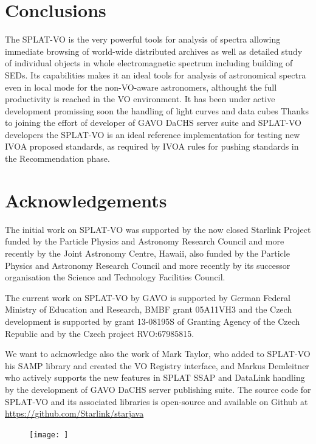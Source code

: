 \documentclass[final,authoryear,5p,times,twocolumn]{elsarticle}
\begin{document}
\section{Conclusions}

The SPLAT-VO is the very powerful tools for analysis of spectra
allowing immediate browsing of world-wide distributed archives as well
as detailed study of individual objects in whole electromagnetic
spectrum including building of SEDs. Its capabilities makes it an
ideal tools for analysis of astronomical spectra even in local mode
for the non-VO-aware astronomers, althought the full productivity is
reached in the VO environment.  It has been under active development
promissing soon the handling of light curves and data cubes Thanks to
joining the effort of developer of GAVO DaCHS server suite and
SPLAT-VO developers the SPLAT-VO is an ideal reference implementation
for testing new IVOA proposed standards, as required by IVOA rules for
pushing standards in the Recommendation phase.

\section*{Acknowledgements}

The initial work on SPLAT-VO was supported
by the now closed Starlink Project funded by the Particle Physics and
Astronomy Research Council and more recently by the Joint Astronomy
Centre, Hawaii, also funded by the Particle Physics and Astronomy
Research Council and more recently by its successor organisation the
Science and Technology Facilities Council.

The current work on SPLAT-VO by GAVO is supported by German Federal
Ministry of Education and Research, BMBF grant 05A11VH3 and the Czech
development is supported by grant 13-08195S of Granting Agency of the
Czech Republic and by the Czech project RVO:67985815.

We want to acknowledge also the work of Mark Taylor, who added to
SPLAT-VO his SAMP library and created the VO Registry interface, and
Markus Demleitner who actively supports the new features in SPLAT SSAP
and DataLink handling by the development of GAVO DaCHS server publishing suite.
The source code for SPLAT-VO and its associated libraries is
open-source and available on Github at
\url{https://github.com/Starlink/starjava}





\begin{figure}
\begin{center}
\texttt{[image: ]}
\caption{}
\label{fig:}
\end{center}
\end{figure}
\end{document}
